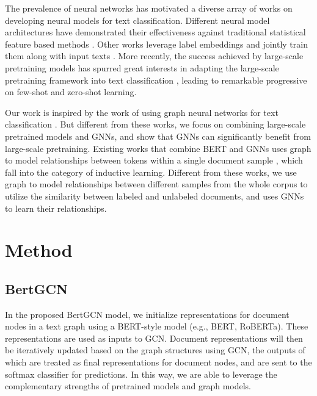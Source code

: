 \documentclass[11pt,a4paper]{article}
\begin{document}
The prevalence of neural networks has motivated a diverse array of works on developing neural models for text classification. Different neural model architectures \citep{kim2014convolutional,zhou2015c,radford2018improving,chai2020description} have demonstrated their effectiveness against traditional statistical feature based methods \citep{wallach2006topic}. 
Other works leverage label embeddings and jointly train them along with input texts \citep{wang2018joint,pappas2019gile}.
More recently, the success achieved by large-scale pretraining models has spurred great interests in adapting the large-scale pretraining framework \citep{devlin2018bert} into text classification \citep{reimers2019sentence}, leading to remarkable progressive on few-shot \citep{mukherjee2020uncertaintyaware} and zero-shot \citep{ye-etal-2020-zero} learning. 

Our work is inspired by the work of using graph neural networks for text classification \citep{yao2019graph,huang2019text,zhang2020text}. But different from these works, we focus on combining large-scale pretrained models and GNNs, and show that GNNs can significantly benefit from large-scale pretraining. 
Existing works that combine BERT and GNNs uses graph to model relationships between tokens within a single document sample \citep{lu2020vgcn,he2020enhancing}, which fall into the category of inductive learning. Different from these works, we use graph to model relationships between different samples from the whole corpus to utilize the similarity between labeled and unlabeled documents, and uses GNNs to learn their relationships.

\section{Method}


\subsection{BertGCN}

In the proposed BertGCN model, 
we initialize  representations for document nodes in a text graph 
using
 a BERT-style model (e.g., BERT, RoBERTa).
 These representations 
   are used as inputs to GCN. 
 Document  representations will then be iteratively updated based on the graph structures  using GCN, the outputs of which are treated as final representations for document nodes, 
 and are sent to the softmax classifier for predictions. 
In this way,
 we are able to  leverage the complementary strengths of pretrained models and graph models.
\end{document}
